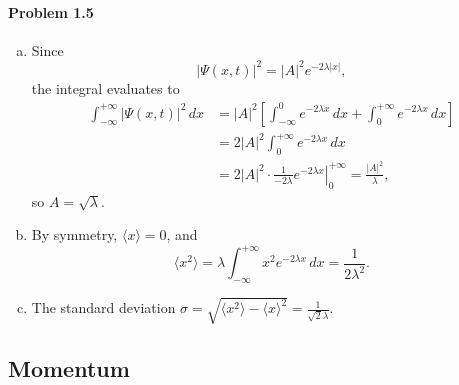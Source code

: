 \documentclass{article}
\begin{document}
\paragraph{Problem 1.5}
\begin{enumerate}[(a)]
  \item Since \[
      |\Psi(x, t)|^2 = |A|^2 e^{-2 \lambda |x|},
    \] the integral evaluates to
    \begin{align*}
      \int_{-\infty}^{+\infty} |\Psi(x, t)|^2 \,dx
      &= |A|^2 \left[
        \int_{-\infty}^0 e^{-2 \lambda x} \,dx +
        \int_0^{+\infty} e^{-2 \lambda x} \,dx
      \right] \\
      &= 2|A|^2 \int_0^{+\infty} e^{-2 \lambda x} \,dx \\
      &= 2|A|^2 \cdot \left.
        \frac{1}{-2\lambda} e^{-2 \lambda x}
      \right|_0^{+\infty} = \frac{|A|^2}{\lambda},
    \end{align*}
    so $A = \sqrt{\lambda}$.
  \item By symmetry, $\langle x \rangle = 0$, and
    \begin{equation*}
      \langle x^2 \rangle
      = \lambda \int_{-\infty}^{+\infty} x^2 e^{-2 \lambda x} \,dx
      = \frac{1}{2\lambda^2}.
    \end{equation*}
  \item The standard deviation $\sigma = \sqrt{\langle x^2 \rangle -
    \langle x \rangle^2} = \frac{1}{\sqrt{2} \lambda}$.
\end{enumerate}

\subsection{Momentum}
\end{document}
